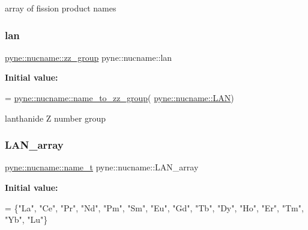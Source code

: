 array of fission product names 

\mbox{\label{namespacepyne_1_1nucname_a57f088736eb390e4b1026d3561c90df2}} 
\subsubsection{\texorpdfstring{lan}{lan}}
{\footnotesize\ttfamily \hyperlink{namespacepyne_1_1nucname_a2e9463e61005389bbc50bfa210061582}{pyne\+::nucname\+::zz\+\_\+group} pyne\+::nucname\+::lan}

{\bfseries Initial value\+:}
\begin{DoxyCode}
= 
  \hyperlink{namespacepyne_1_1nucname_a0f6bd8d281ff5aa5fd5b48e16b867062}{pyne::nucname::name\_to\_zz\_group}(
      \hyperlink{namespacepyne_1_1nucname_a323f62776d676e54af5cc3997fc1fad6}{pyne::nucname::LAN})
\end{DoxyCode}


lanthanide Z number group 

\mbox{\label{namespacepyne_1_1nucname_a07e5e0cbfd0d1264743a8d8bcfbceef8}} 
\subsubsection{\texorpdfstring{L\+A\+N\+\_\+array}{LAN\_array}}
{\footnotesize\ttfamily \hyperlink{namespacepyne_1_1nucname_aed6b656cde69b79b33f6af37fabb2054}{pyne\+::nucname\+::name\+\_\+t} pyne\+::nucname\+::\+L\+A\+N\+\_\+array}

{\bfseries Initial value\+:}
\begin{DoxyCode}
= \{\textcolor{stringliteral}{"La"}, \textcolor{stringliteral}{"Ce"}, \textcolor{stringliteral}{"Pr"}, \textcolor{stringliteral}{"Nd"},
  \textcolor{stringliteral}{"Pm"}, \textcolor{stringliteral}{"Sm"}, \textcolor{stringliteral}{"Eu"}, \textcolor{stringliteral}{"Gd"}, \textcolor{stringliteral}{"Tb"}, \textcolor{stringliteral}{"Dy"}, \textcolor{stringliteral}{"Ho"}, \textcolor{stringliteral}{"Er"}, \textcolor{stringliteral}{"Tm"}, \textcolor{stringliteral}{"Yb"}, \textcolor{stringliteral}{"Lu"}\}
\end{DoxyCode}


